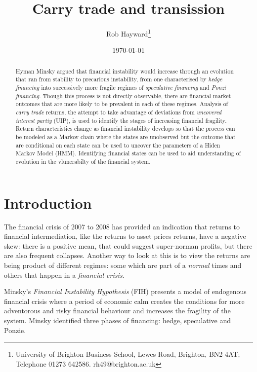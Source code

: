 \documentclass[12pt, a4paper, oneside]{article} %
\begin{document}
\title{Carry trade and transission}
\author{Rob Hayward\footnote{University of Brighton Business School, Lewes Road, Brighton, BN2 4AT; Telephone 01273 642586.  rh49@brighton.ac.uk}} 
\date{\today}
\maketitle
\begin{abstract}
Hyman Minsky argued that financial instability would increase through an evolution that ran from stability to precarious instability, from one characterised by \emph{hedge financing} into successively more fragile regimes of \emph{speculative financing} and \emph{Ponzi financing}.  Though this process is not directly observable, there are financial market outcomes that are more likely to be prevalent in each of these regimes.  Analysis of \emph{carry trade} returns, the attempt to take advantage of deviations from \emph{uncovered interest partiy} (UIP), is used to identify the stages of increasing financial fragility.  Return characteristics change as financial instability develops so that the process can be modeled as a Markov chain where the states are unobserved but the outcome that are conditional on each state can be used to uncover the parameters of a Hiden Markov Model (HMM).   Identifying financial states can be used to aid understanding of evolution in the vlunerabilty of the financial system.  %

\end{abstract}

\section{Introduction}
The financial crisis of 2007 to 2008 has provided an indication that returns to financial intermediation, like the returns to asset prices returns, have a negative skew:  there is a positive mean, that could suggest super-norman profits, but there are also frequent collapses.  Another way to look at this is to view the returns are being product of different regimes:  some which are part of a \emph{normal} times and others that happen in a \emph{financial crisis}. 

Minsky's \emph{Financial Instability Hypothesis} (FIH) presents a model of endogenous financial crisis where a period of economic calm creates the conditions for more adventorous and risky financial behaviour and increases the fragility of the system.  Minsky identified three phases of financing:  hedge, speculative and Ponzie.  
\end{document}
